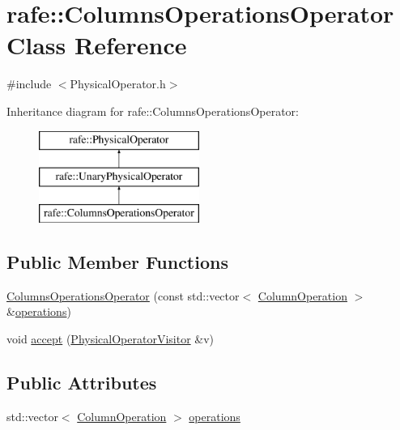 \hypertarget{classrafe_1_1_columns_operations_operator}{\section{rafe\+:\+:Columns\+Operations\+Operator Class Reference}
\label{classrafe_1_1_columns_operations_operator}
}


{\ttfamily \#include $<$Physical\+Operator.\+h$>$}

Inheritance diagram for rafe\+:\+:Columns\+Operations\+Operator\+:\begin{figure}[H]
\begin{center}
\leavevmode
\includegraphics[height=3.000000cm]{classrafe_1_1_columns_operations_operator}
\end{center}
\end{figure}
\subsection*{Public Member Functions}
\begin{DoxyCompactItemize}
\item 
\hyperlink{classrafe_1_1_columns_operations_operator_a2fabdd215667318465dcd75d878db071}{Columns\+Operations\+Operator} (const std\+::vector$<$ \hyperlink{classrafe_1_1_column_operation}{Column\+Operation} $>$ \&\hyperlink{classrafe_1_1_columns_operations_operator_a163a3eac6eb7336bda80ba844610880c}{operations})
\item 
void \hyperlink{classrafe_1_1_columns_operations_operator_a4fd8d03b5fd03393ea72dd46f4c11504}{accept} (\hyperlink{classrafe_1_1_physical_operator_visitor}{Physical\+Operator\+Visitor} \&v)
\end{DoxyCompactItemize}
\subsection*{Public Attributes}
\begin{DoxyCompactItemize}
\item 
std\+::vector$<$ \hyperlink{classrafe_1_1_column_operation}{Column\+Operation} $>$ \hyperlink{classrafe_1_1_columns_operations_operator_a163a3eac6eb7336bda80ba844610880c}{operations}
\end{DoxyCompactItemize}


